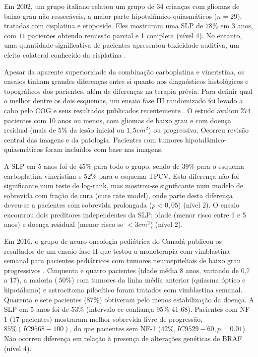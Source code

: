 \documentclass[11pt,a4paper,oldfontcommands]{memoir}
\begin{document}
Em 2002, um grupo italiano relatou um grupo de 34 crianças com gliomas de baixo grau não ressecáveis, a maior parte hipotalâmico-quiasmáticos (\(n=29\)), tratadas com cisplatina e etoposide. Eles mostraram uma SLP de \(78\%\) em 3 anos, com \(11\) pacientes obtendo remissão parcial e 1 completa (nível 4). No entanto, uma quantidade significativa de pacientes apresentou toxicidade auditiva, um efeito colateral conhecido da cisplatina \cite{mass}.

Apesar da aparente superioridade da combinação carboplatina e vincristina, os ensaios tinham grandes diferenças entre si quanto aos diagnósticos histológicos e topográficos dos pacientes, além de diferenças na terapia prévia. Para definir qual o melhor dentre os dois esquemas, um ensaio fase III randomizado foi levado a cabo pelo COG e seus resultados publicados recentemente \cite{Ater20072012}. O estudo avaliou \(274\) pacientes com 10 anos ou menos, com gliomas de baixo grau e com doença residual (mais de \(5\%\) da lesão inicial ou \(1,5 cm^2\)) ou progressiva. Ocorreu revisão central das imagens e da patologia. Pacientes com tumores hipotalâmico-quiasmáticos foram incluídos com base nas imagens. 

A SLP em 5 anos foi de \(45\%\) para todo o grupo, sendo de \(39\%\) para o esquema carboplatina-vincristina e \(52\%\) para o esquema TPCV. Esta diferença não foi significante num teste de log-rank, mas mostrou-se significante num modelo de sobrevida com fração de cura (cure rate model), onde parte desta diferença deveu-se a pacientes com sobrevida prolongada (\(p<0,05\)) (nível 2). O ensaio encontrou dois preditores independentes da SLP: idade (menor risco entre 1 e 5 anos) e doença residual (menor risco se \(<3 cm^2\)) (nível 2).

Em 2016, o grupo de neuro-oncologia pediátrica do Canadá publicou os resultados de um ensaio fase II que testou a monoterapia com vimblastina semanal para pacientes pediátricos com tumores neuroepiteliais de baixo grau progressivos \cite{lassaletta}. Cinquenta e quatro pacientes (idade média 8 anos, variando de 0,7 a 17), a maioria (\(~ 50\%\)) com tumores da linha média anterior (quiasma óptico e hipotálamo) e astrocitoma pilocítico foram tratados com vimblastina semanal. Quarenta e sete pacientes (\(87\%\)) obtiveram pelo menos estabilização da doença. A SLP em 5 anos foi de \(53\%\) (intervalo ce confiança 95\% 41-68). Pacientes com NF-1 (17 pacientes) mostraram melhor sobrevida livre de progressão, \(85\% (IC95 68-100)\), do que pacientes sem NF-1 (\(42\%, IC95 29-60, p = 0.01\)). Não ocorreu diferença em relação à presença de alterações genéticas de BRAF (nível 4).
\end{document}
